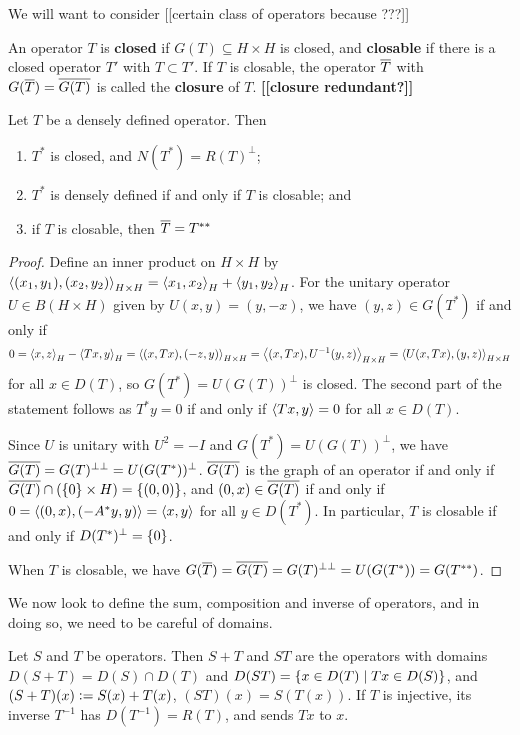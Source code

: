 \documentclass[10pt]{amsart}
\begin{document}
We will want to consider [[certain class of operators because ???]]
\begin{definition}
    An operator $T$ is \textbf{closed} if $G(T) \subseteq H \times H$ is closed, and \textbf{closable} if there is a closed operator $T'$ with $T \subset T'$. If $T$ is closable, the operator $\overline{T}$ with $G(\overline{T}) = \overline{G(T)}$ is called the \textbf{closure} of $T$. \textbf{[[closure redundant?]]}
\end{definition}
\begin{proposition}
    Let $T$ be a densely defined operator. Then
    \begin{enumerate}
        \item $T^*$ is closed, and $N(T^*) = R(T)^\perp$;
        \item $T^*$ is densely defined if and only if $T$ is closable; and 
        \item if $T$ is closable, then $\overline{T} = T^{**}$
    \end{enumerate}
\end{proposition}
\begin{proof}
    Define an inner product on $H \times H$ by $\left\langle (x_1, y_1), (x_2, y_2) \right\rangle_{H \times H} = \left\langle x_1, x_2 \right\rangle_H + \left\langle y_1, y_2 \right\rangle_H$. For the unitary operator $U \in B(H \times H)$ given by $U(x, y) = (y, -x)$, we have $(y, z) \in G(T^*)$ if and only if 
    $$
        0 = \left\langle x, z \right\rangle_H - \left\langle Tx, y \right\rangle_H = \left\langle (x, Tx), (-z, y) \right\rangle_{H \times H} = \left\langle (x, Tx), U^{-1}(y, z) \right\rangle_{H \times H} = \left\langle U(x, Tx), (y, z) \right\rangle_{H \times H}
    $$
    for all $x \in D(T)$, so $G(T^*) = U(G(T))^\perp$ is closed. The second part of the statement follows as $T^*y = 0$ if and only if $\left\langle Tx, y \right\rangle = 0$ for all $x \in D(T)$.

    Since $U$ is unitary with $U^2 = -I$ and $G(T^*) = U(G(T))^\perp$, we have $\overline{G(T)} = G(T)^{\perp\perp} = U(G(T^*))^\perp$. $\overline{G(T)}$ is the graph of an operator if and only if $\overline{G(T)} \cap (\left\{  0  \right\} \times H) = \left\{  (0, 0)  \right\}$, and $(0, x) \in \overline{G(T)}$ if and only if $0 = \left\langle (0, x), (-A^*y, y) \right\rangle = \left\langle x, y \right\rangle$ for all $y \in D(T^*)$. In particular, $T$ is closable if and only if $D(T^*)^\perp = \left\{  0  \right\}$.

    When $T$ is closable, we have $G(\overline{T}) = \overline{G(T)} = G(T)^{\perp\perp} = U(G(T^*)) = G(T^{**})$.
\end{proof}
We now look to define the sum, composition and inverse of operators, and in doing so, we need to be careful of domains.
\begin{definition}
    Let $S$ and $T$ be operators. Then $S + T$ and $ST$ are the operators with domains $D(S + T) = D(S) \cap D(T)$ and $D(ST) = \left\{  x \in D(T) \mid Tx \in D(S)  \right\}$, and $(S + T)(x) \vcentcolon= S(x) + T(x)$, $(ST)(x) = S(T(x))$. If $T$ is injective, its inverse $T^{-1}$ has $D(T^{-1}) = R(T)$, and sends $Tx$ to $x$.
\end{definition}
\end{document}
